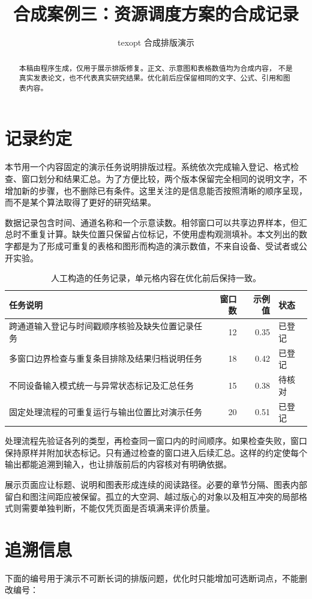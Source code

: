\documentclass[UTF8,10pt,a4paper,fontset=windows]{ctexart}
\title{合成案例三：资源调度方案的合成记录}
\author{texopt 合成排版演示}
\date{}
\begin{document}
\maketitle
\begin{abstract}
本稿由程序生成，仅用于展示排版修复。正文、示意图和表格数值均为合成内容，
不是真实发表论文，也不代表真实研究结果。优化前后应保留相同的文字、公式、引用和图表内容。
\end{abstract}
\section{记录约定}
本节用一个内容固定的演示任务说明排版过程。系统依次完成输入登记、格式检查、窗口划分和结果汇总。为了方便比较，两个版本保留完全相同的说明文字，不增加新的步骤，也不删除已有条件。这里关注的是信息能否按照清晰的顺序呈现，而不是某个算法取得了更好的研究结果。

数据记录包含时间、通道名称和一个示意读数。相邻窗口可以共享边界样本，但汇总时不重复计算。缺失位置只保留占位标记，不使用虚构观测填补。本文列出的数字都是为了形成可重复的表格和图形而构造的演示数值，不来自设备、受试者或公开实验。

\begin{table}[!htbp]
\centering
\caption{人工构造的任务记录，单元格内容在优化前后保持一致。}
\label{tab:wide}
\begin{tabular}{lrrl}
\toprule
任务说明 & 窗口数 & 示例值 & 状态 \\
\midrule
跨通道输入登记与时间戳顺序核验及缺失位置记录任务 & 12 & 0.35 & 已登记 \\
多窗口边界检查与重复条目排除及结果归档说明任务 & 18 & 0.42 & 已登记 \\
不同设备输入模式统一与异常状态标记及汇总任务 & 15 & 0.38 & 待核对 \\
固定处理流程的可重复运行与输出位置比对演示任务 & 20 & 0.51 & 已登记 \\
\bottomrule
\end{tabular}
\end{table}
处理流程先验证各列的类型，再检查同一窗口内的时间顺序。如果检查失败，窗口保持原样并附加状态标记。只有通过检查的窗口进入后续汇总。这样的约定使每个输出都能追溯到输入，也让排版前后的内容核对有明确依据。

展示页面应让标题、说明和图表形成连续的阅读路径。必要的章节分隔、图表内部留白和图注间距应被保留。孤立的大空洞、越过版心的对象以及相互冲突的局部格式则需要单独判断，不能仅凭页面是否填满来评价质量。

\section{追溯信息}
下面的编号用于演示不可断长词的排版问题，优化时只能增加可选断词点，不能删改编号：
\end{document}
